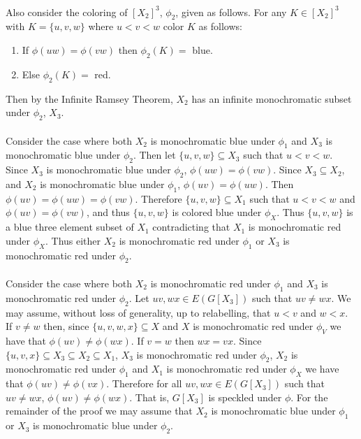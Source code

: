 \documentclass[letterpaper,12pt,oneside,onecolumn]{article}
\begin{document}
\paragraph{}
Also consider the coloring of $[X_2]^3$, $\phi_2$, given as follows. For any $K \in [X_2]^3$ with $K = \{u,v,w\}$ where $u<v<w$ color $K$ as follows:
\begin{enumerate}
\item If $\phi(uw) = \phi(vw)$ then $\phi_2(K)=$ blue.
\item Else $\phi_2(K)=$ red.
\end{enumerate}
Then by the Infinite Ramsey Theorem, $X_2$ has an infinite monochromatic subset under $\phi_2$, $X_3$.
\paragraph{}
Consider the case where both $X_2$ is monochromatic blue under $\phi_1$ and $X_3$ is monochromatic blue under $\phi_2$. Then let $\{u,v,w\} \subseteq X_3$ such that $u<v<w$. Since $X_3$ is monochromatic blue under $\phi_2$, $\phi(uw) = \phi(vw)$. Since $X_3 \subseteq X_2$, and $X_2$ is monochromatic blue under $\phi_1$, $\phi(uv) = \phi(uw)$. Then $\phi(uv) = \phi(uw) = \phi(vw)$. Therefore $\{u,v,w\} \subseteq X_1$ such that $u<v<w$ and $\phi(uv) = \phi(vw)$, and thus $\{u,v,w\}$ is colored blue under $\phi_X$. Thus $\{u,v,w\}$ is a blue three element subset of $X_1$ contradicting that $X_1$ is monochromatic red under $\phi_X$. Thus either $X_2$ is monochromatic red under $\phi_1$ or $X_3$ is monochromatic red under $\phi_2$.
\paragraph{}
Consider the case where both $X_2$ is monochromatic red under $\phi_1$ and $X_3$ is monochromatic red under $\phi_2$. Let $uv,wx \in E(G[X_3])$ such that $uv \neq wx$. We may assume, without loss of generality, up to relabelling, that $u<v$ and $w<x$. If $v \neq w$ then, since $\{u,v,w,x\} \subseteq  X$ and $X$ is monochromatic red under $\phi_V$ we have that $\phi(uv) \neq \phi(wx)$. If $v=w$ then $wx = vx$. Since $\{u,v,x\} \subseteq X_3 \subseteq X_2 \subseteq X_1$, $X_3$ is monochromatic red under $\phi_2$, $X_2$ is monochromatic red under $\phi_1$ and $X_1$ is monochromatic red under $\phi_X$ we have that $\phi(uv) \neq \phi(vx)$. Therefore for all $uv, wx \in E(G[X_3])$ such that $uv \neq wx$, $\phi(uv) \neq \phi(wx)$. That is, $G[X_3]$ is speckled under $\phi$. For the remainder of the proof we may assume that $X_2$ is monochromatic blue under $\phi_1$ or $X_3$ is monochromatic blue under $\phi_2$.
\end{document}
